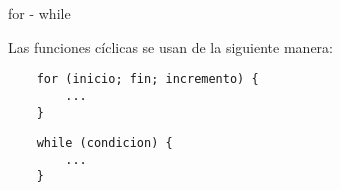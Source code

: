\begin{frame}[fragile]{for - while}\vspace{10pt}

Las funciones c\'iclicas se usan de la siguiente manera:

\begin{center}
\begin{lstlisting}
	for (inicio; fin; incremento) {
		...	
	}
\end{lstlisting}
\end{center}

\begin{center}
\begin{lstlisting}
	while (condicion) {
		...	
	}
\end{lstlisting}
\end{center}

\end{frame}